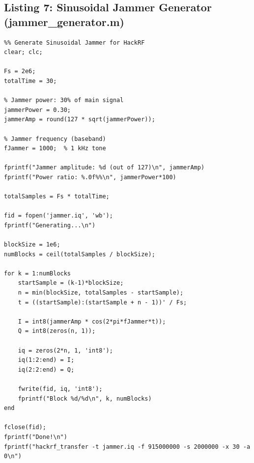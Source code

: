 \documentclass{article}
\begin{document}
\subsection{Listing 7: Sinusoidal Jammer Generator (jammer\_generator.m)}\label{lst:jamgen}
\begin{verbatim}
%% Generate Sinusoidal Jammer for HackRF
clear; clc;

Fs = 2e6;
totalTime = 30;

% Jammer power: 30% of main signal
jammerPower = 0.30;
jammerAmp = round(127 * sqrt(jammerPower));

% Jammer frequency (baseband)
fJammer = 1000;  % 1 kHz tone

fprintf("Jammer amplitude: %d (out of 127)\n", jammerAmp)
fprintf("Power ratio: %.0f%%\n", jammerPower*100)

totalSamples = Fs * totalTime;

fid = fopen('jammer.iq', 'wb');
fprintf("Generating...\n")

blockSize = 1e6;
numBlocks = ceil(totalSamples / blockSize);

for k = 1:numBlocks
    startSample = (k-1)*blockSize;
    n = min(blockSize, totalSamples - startSample);
    t = ((startSample):(startSample + n - 1))' / Fs;

    I = int8(jammerAmp * cos(2*pi*fJammer*t));
    Q = int8(zeros(n, 1));

    iq = zeros(2*n, 1, 'int8');
    iq(1:2:end) = I;
    iq(2:2:end) = Q;

    fwrite(fid, iq, 'int8');
    fprintf("Block %d/%d\n", k, numBlocks)
end

fclose(fid);
fprintf("Done!\n")
fprintf("hackrf_transfer -t jammer.iq -f 915000000 -s 2000000 -x 30 -a 0\n")
\end{verbatim}
\end{document}
